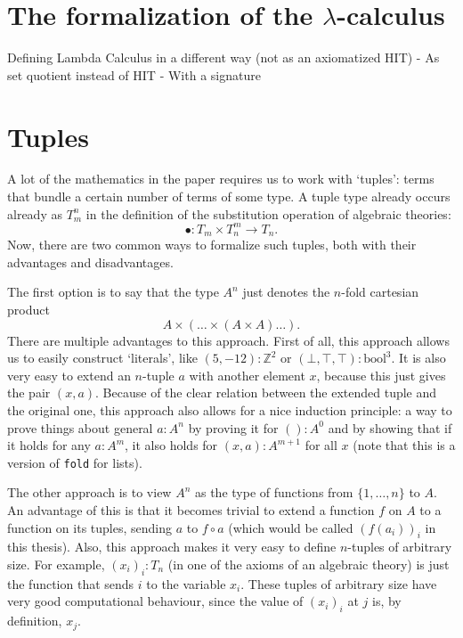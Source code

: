 \section{The formalization of the \texorpdfstring{$ \lambda $}{lambda}-calculus} \label{sec:axiomatic-lambda-calculus}
Defining Lambda Calculus in a different way (not as an axiomatized HIT)
  - As set quotient instead of HIT
  - With a signature

\section{Tuples}

A lot of the mathematics in the paper requires us to work with `tuples': terms that bundle a certain number of terms of some type. A tuple type already occurs already as $ T_m^n $ in the definition of the substitution operation of algebraic theories:
\[ \bullet: T_m \times T_n^m \to T_n. \]
Now, there are two common ways to formalize such tuples, both with their advantages and disadvantages.

The first option is to say that the type $ A^n $ just denotes the $ n $-fold cartesian product
\[ A \times (\dots \times (A \times A) \dots). \]
There are multiple advantages to this approach. First of all, this approach allows us to easily construct `literals', like $ (5, -12) : \mathbb Z^2 $ or $ (\bot, \top, \top) : \mathrm{bool}^3 $. It is also very easy to extend an $ n $-tuple $ a $ with another element $ x $, because this just gives the pair $ (x, a) $. Because of the clear relation between the extended tuple and the original one, this approach also allows for a nice induction principle: a way to prove things about general $ a : A^n $ by proving it for $ () : A^0 $ and by showing that if it holds for any $ a : A^m $, it also holds for $ (x, a) : A^{m + 1} $ for all $ x $ (note that this is a version of \texttt{fold} for lists).

The other approach is to view $ A^n $ as the type of functions from $ \{ 1, \dots, n \} $ to $ A $. An advantage of this is that it becomes trivial to extend a function $ f $ on $ A $ to a function on its tuples, sending $ a $ to $ f \circ a $ (which would be called $ (f(a_i))_i $ in this thesis). Also, this approach makes it very easy to define $ n $-tuples of arbitrary size. For example, $ (x_i)_i : T_n $ (in one of the axioms of an algebraic theory) is just the function that sends $ i $ to the variable $ x_i $. These tuples of arbitrary size have very good computational behaviour, since the value of $ (x_i)_i $ at $ j $ is, by definition, $ x_j $.


